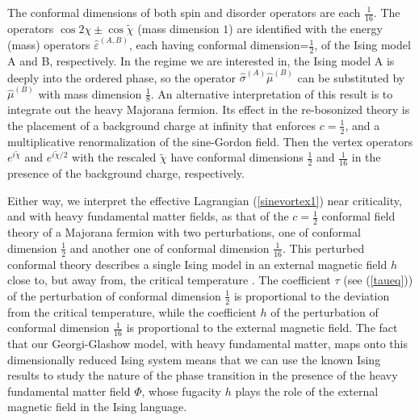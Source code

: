 \documentclass[a4paper,aps,prd,superscriptaddress,showpacs,showkeys]{revtex4}
\begin{document}
The conformal dimensions of both spin and disorder operators are each
$\frac{1}{16}$.
The operators $\cos {2{\chi}}\pm\cos {\tilde{\chi}}$ (mass
dimension $1$)
are identified with the energy (mass) operators
$\hat{\varepsilon}^{(A,B)}$, each having conformal
dimension=$\frac{1}{2}$, of  the Ising model A and B, respectively.
In the regime we are interested in, the Ising model A is deeply into the
ordered phase, so
the operator $\hat{\sigma}^{(A)}\hat{\mu}^{(B)}$ can be substituted by
$\hat{\mu}^{(B)}$ with mass dimension $\frac18$.
An alternative interpretation of this result is to integrate out the heavy
Majorana fermion. Its effect in the re-bosonized theory is
the placement of a background charge at infinity that enforces
$c=\frac{1}{2}$,
and a multiplicative renormalization of the sine-Gordon field.
Then the vertex operators $e^{i \tilde{\chi}}$ and $e^{i\tilde{\chi}/2}$
with the rescaled $\tilde{\chi}$ have
conformal dimensions $\frac{1}{2}$ and $\frac{1}{16}$ in the presence
of the background charge, respectively.

Either way, we interpret the effective Lagrangian (\ref{sinevortex1})
near criticality, and with heavy  fundamental matter fields, as that of
the $c=\frac{1}{2}$ conformal field theory of a Majorana fermion
with two perturbations, one of conformal dimension
$\frac{1}{2}$ and another one of conformal dimension $\frac{1}{16}$.
This perturbed conformal theory describes a single
Ising model
in an external magnetic field $h$ close to, but away from, the critical
temperature
\cite{mccoy,delfino1,zamolodchikov}. 
The coefficient $\tau$ (see (\ref{taueq})) of the
perturbation of conformal dimension
$\frac{1}{2}$ is proportional to the deviation from the
critical temperature, while the coefficient $h$ of the perturbation of
conformal dimension $\frac{1}{16}$ is proportional to the external
magnetic field. The fact that our Georgi-Glashow model, with heavy
fundamental matter, maps onto this dimensionally reduced Ising system
means that we can use the known Ising results to study the nature of the
phase transition in the presence of the heavy fundamental matter field
$\Phi$, whose fugacity
$h$ plays the role of the external magnetic field in the Ising language.
\end{document}

